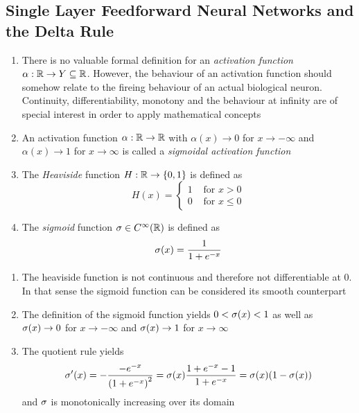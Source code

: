 \subsection{Single Layer Feedforward Neural Networks and the Delta Rule}
\bigskip

\begin{definition}
    \hfill
    \begin{enumerate}
        \item There is no valuable formal definition for an \emph{activation function}
              \( \alpha: \mathbb{R} \to Y \subseteq \mathbb{R} \). However, the behaviour of an activation function should
              somehow relate to the fireing behaviour of an actual biological neuron. Continuity,
              differentiability, monotony and the behaviour at infinity are of special interest in order
              to apply mathematical concepts
        \item An activation function \( \alpha: \mathbb{R} \to \mathbb{R} \) with \( \alpha(x) \to 0 \)
              for \( x \to -\infty \) and \( \alpha(x) \to 1 \) for \( x \to \infty \) is called a
              \emph{sigmoidal activation function}
        \item The \emph{Heaviside} function \( H: \mathbb{R} \to \{ 0, 1 \} \) is defined as
              \[
                  H(x) = \left \{
                  \begin{array}{ll}
                      1 & \text{ for } x > 0  \\
                      0 & \text{ for }x \le 0
                  \end{array}
                  \right.
              \]
        \item The \emph{sigmoid} function \( \sigma \in C^\infty(\mathbb{R}) \) is defined as
              \[
                  \sigma(x) = \frac{1}{1 + e^{-x}}
              \]
    \end{enumerate}
\end{definition}
\bigskip


\begin{remarks}
    \hfill
    \begin{enumerate}
        \item The heaviside function is not continuous and therefore not differentiable at \( 0 \).
              In that sense the sigmoid function can be considered its smooth counterpart
        \item The definition of the sigmoid function yields \( 0 < \sigma(x) < 1 \) as well as
              \( \sigma(x) \to 0 \) for \( x \to -\infty \) and \( \sigma(x) \to 1 \)
              for \( x \to \infty \)
        \item The quotient rule yields
              \[
                  \sigma'(x)
                  = -\frac{-e^{-x}}{{(1 + e^{-x})}^2}
                  = \sigma(x) \frac{1 + e^{-x} - 1}{1 + e^{-x}}
                  = \sigma(x)(1 - \sigma(x))
              \]
              and \( \sigma \) is monotonically increasing over its domain
    \end{enumerate}
\end{remarks}
\bigskip


